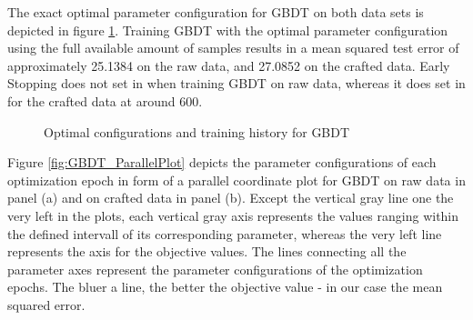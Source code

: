 The exact optimal parameter configuration for GBDT on both data sets is depicted in figure \ref{fig:GBDT_Optimal}. Training GBDT with the optimal parameter configuration using the full available amount of samples results in a mean squared test error of approximately 25.1384 on the raw data, and 27.0852 on the crafted data. Early Stopping does not set in when training GBDT on raw data, whereas it does set in for the crafted data at around 600. 
\begin{figure}[h]
	\centering
	\caption{Optimal configurations and training history for GBDT}
	\label{fig:GBDT_Optimal}
\end{figure}
Figure \ref{fig:GBDT_ParallelPlot} depicts the parameter configurations of each optimization epoch in form of a parallel coordinate plot for GBDT on raw data in panel (a) and on crafted data in panel (b). Except the vertical gray line one the very left in the plots, each vertical gray axis represents the values ranging within the defined intervall of its corresponding parameter, whereas the very left line represents the axis for the objective values. The lines connecting all the parameter axes represent the parameter configurations of the optimization epochs. The bluer a line, the better the objective value - in our case the mean squared error. 
